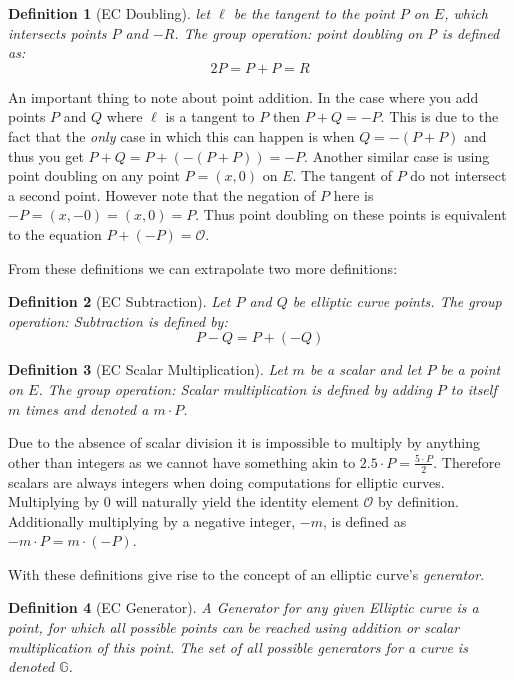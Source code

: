 \documentclass{article}
\newtheorem{definition}{Definition}[section]
\renewcommand{\O}{\mathcal{O}}
\newcommand{\G}{\mathbb{G}}
\begin{document}
\begin{definition}[EC Doubling]
	let $\ell$ be the tangent to the point $P$ on $E$, which intersects
	points $P$ and $-R$. The group operation: point doubling on P is
	defined as:
	$$2P = P + P = R$$
\end{definition}

An important thing to note about point addition. In the case where
you add points $P$ and $Q$ where $\ell$ is a tangent to $P$ then $P +
Q = -P$. This is due to the fact that the \textit{only} case in which
this can happen is when $Q = -(P + P)$ and thus you get $P + Q = P +
(-(P + P)) = -P$. Another similar case is using point doubling on any
point $P = (x,0)$ on $E$. The tangent of $P$ do not intersect
a second point. However note that the negation of $P$ here is $-P =
(x,-0) = (x,0) = P$. Thus point doubling on these points is equivalent
to the equation $P + (-P) = \O$.

From these definitions we can extrapolate two more definitions:

\begin{definition}[EC Subtraction]
	Let $P$ and $Q$ be elliptic curve points. The group operation:
	Subtraction is defined by:
	$$P-Q = P + (-Q)$$
\end{definition}

\begin{definition}[EC Scalar Multiplication]
	Let $m$ be a scalar and let $P$ be a point on $E$. The group operation:
	Scalar multiplication is defined by adding $P$ to itself $m$ times and
	denoted a $m\cdot P$.
\end{definition}

Due to the absence of scalar division it is impossible to multiply by
anything other than integers as we cannot have something akin to $2.5
\cdot P = \frac{5\cdot P}{2}$. Therefore scalars are always integers
when doing computations for elliptic curves. Multiplying by $0$ will
naturally yield the identity element $\mathcal{O}$ by definition.
Additionally multiplying by a negative integer, ${-m}$, is defined as
$-m\cdot P = m\cdot ({-P})$.

With these definitions give rise to the concept of an elliptic
curve's \textit{generator}.

\begin{definition}[EC Generator]
	A Generator for any given Elliptic curve is a point, for
	which all possible points can be reached using addition or
	scalar multiplication of this point. The set of all possible
	generators for a curve is denoted $\G$.
\end{definition}
\end{document}
